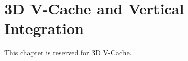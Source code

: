 \chapter{3D V-Cache and Vertical Integration}
\label{chap:3d-vcache}

This chapter is reserved for 3D V-Cache.

